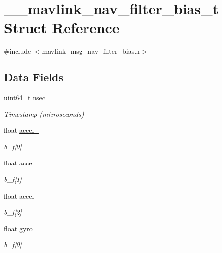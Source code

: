 \hypertarget{struct____mavlink__nav__filter__bias__t}{\section{\+\_\+\+\_\+mavlink\+\_\+nav\+\_\+filter\+\_\+bias\+\_\+t Struct Reference}
\label{struct____mavlink__nav__filter__bias__t}
}


{\ttfamily \#include $<$mavlink\+\_\+msg\+\_\+nav\+\_\+filter\+\_\+bias.\+h$>$}

\subsection*{Data Fields}
\begin{DoxyCompactItemize}
\item 
uint64\+\_\+t \hyperlink{struct____mavlink__nav__filter__bias__t_aacc8bcbbd29fd2c5f4500c9d588e76a3}{usec}
\begin{DoxyCompactList}\small\item\em Timestamp (microseconds) \end{DoxyCompactList}\item 
float \hyperlink{struct____mavlink__nav__filter__bias__t_a6800931fe80e11e28fd7cd375cf20301}{accel\+\_}
\begin{DoxyCompactList}\small\item\em b\+\_\+f\mbox{[}0\mbox{]} \end{DoxyCompactList}\item 
float \hyperlink{struct____mavlink__nav__filter__bias__t_ac6c566a96fcf139842704d16c2e846c2}{accel\+\_}
\begin{DoxyCompactList}\small\item\em b\+\_\+f\mbox{[}1\mbox{]} \end{DoxyCompactList}\item 
float \hyperlink{struct____mavlink__nav__filter__bias__t_abebe9aefb1c6524569153b0f7954f076}{accel\+\_}
\begin{DoxyCompactList}\small\item\em b\+\_\+f\mbox{[}2\mbox{]} \end{DoxyCompactList}\item 
float \hyperlink{struct____mavlink__nav__filter__bias__t_a20f6563cb99f45e5f2bcb97c0df045a6}{gyro\+\_}
\begin{DoxyCompactList}\small\item\em b\+\_\+f\mbox{[}0\mbox{]} \end{DoxyCompactList}\item 

\end{DoxyCompactItemize}
